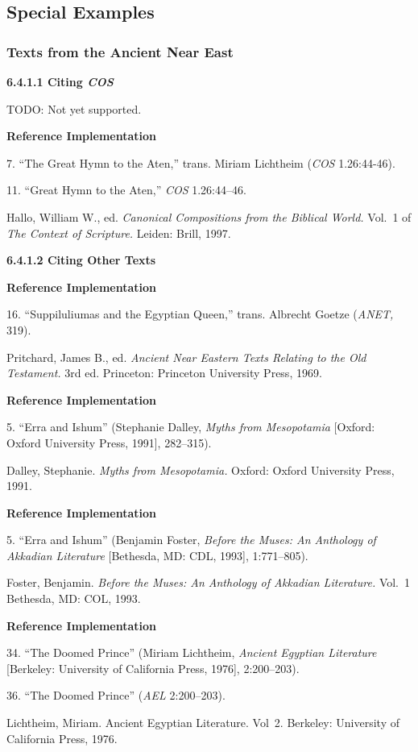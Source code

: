 \documentclass[a4paper]{article}
\newenvironment{refimp}{%
  \begin{minipage}{\linewidth}
    \setlength{\parskip}{1ex}
    \textbf{Reference Implementation}\par
    \nobreak
    \color{reference-colour}
}{\end{minipage}}
\begin{document}
\subsection{Special Examples}

\subsubsection{Texts from the Ancient Near East}

\textbf{6.4.1.1 Citing \emph{COS}}

TODO: Not yet supported.

\begin{refimp}
  7. “The Great Hymn to the Aten,” trans. Miriam Lichtheim (\emph{COS}
  1.26:44-46).

  11. “Great Hymn to the Aten,” \emph{COS} 1.26:44–46.

  \hangindent\bibindent Hallo, William W., ed. \emph{Canonical Compositions
  from the Biblical World.} Vol.~1 of \emph{The Context of Scripture.} Leiden:
  Brill, 1997.
\end{refimp}

\textbf{6.4.1.2 Citing Other Texts}

\begin{refimp}
  16. “Suppiluliumas and the Egyptian Queen,” trans. Albrecht Goetze
  (\emph{ANET,} 319).

  \hangindent\bibindent Pritchard, James B., ed. \emph{Ancient Near Eastern
  Texts Relating to the Old Testament.} 3rd ed. Princeton: Princeton
  University Press, 1969.
\end{refimp}

\begin{refimp}
  5. “Erra and Ishum” (Stephanie Dalley, \emph{Myths from Mesopotamia}
  [Oxford: Oxford University Press, 1991], 282–315).
  
  \hangindent\bibindent Dalley, Stephanie. \emph{Myths from Mesopotamia.}
  Oxford: Oxford University Press, 1991.
\end{refimp}

\begin{refimp}
  5. “Erra and Ishum” (Benjamin Foster, \emph{Before the Muses: An Anthology
  of Akkadian Literature} [Bethesda, MD: CDL, 1993], 1:771–805).
  
  \hangindent\bibindent Foster, Benjamin. \emph{Before the Muses: An Anthology of
  Akkadian Literature.} Vol.~1 Bethesda, MD: COL, 1993.
\end{refimp}

\begin{refimp}
  34. “The Doomed Prince” (Miriam Lichtheim, \emph{Ancient Egyptian
  Literature} [Berkeley: University of California Press, 1976], 2:200–203).
  
  36. “The Doomed Prince” (\emph{AEL} 2:200–203).
  
  \hangindent \bibindent Lichtheim, Miriam. Ancient Egyptian Literature.
  Vol~2. Berkeley: University of California Press, 1976.
\end{refimp}
\end{document}
